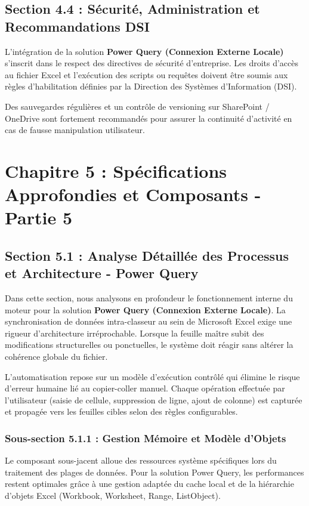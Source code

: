 \documentclass[12pt,a4paper]{report}
\begin{document}
\section{Section 4.4 : Sécurité, Administration et Recommandations DSI}
L'intégration de la solution \textbf{Power Query (Connexion Externe Locale)} s'inscrit dans le respect des directives de sécurité d'entreprise. Les droits d'accès au fichier Excel et l'exécution des scripts ou requêtes doivent être soumis aux règles d'habilitation définies par la Direction des Systèmes d'Information (DSI).

Des sauvegardes régulières et un contrôle de versioning sur SharePoint / OneDrive sont fortement recommandés pour assurer la continuité d'activité en cas de fausse manipulation utilisateur.


\chapter{Chapitre 5 : Spécifications Approfondies et Composants - Partie 5}

\section{Section 5.1 : Analyse Détaillée des Processus et Architecture - Power Query}
Dans cette section, nous analysons en profondeur le fonctionnement interne du moteur pour la solution \textbf{Power Query (Connexion Externe Locale)}. La synchronisation de données intra-classeur au sein de Microsoft Excel exige une rigueur d'architecture irréprochable. Lorsque la feuille maître subit des modifications structurelles ou ponctuelles, le système doit réagir sans altérer la cohérence globale du fichier.

L'automatisation repose sur un modèle d'exécution contrôlé qui élimine le risque d'erreur humaine lié au copier-coller manuel. Chaque opération effectuée par l'utilisateur (saisie de cellule, suppression de ligne, ajout de colonne) est capturée et propagée vers les feuilles cibles selon des règles configurables.


\subsection{Sous-section 5.1.1 : Gestion Mémoire et Modèle d'Objets}
Le composant sous-jacent alloue des ressources système spécifiques lors du traitement des plages de données. Pour la solution Power Query, les performances restent optimales grâce à une gestion adaptée du cache local et de la hiérarchie d'objets Excel (Workbook, Worksheet, Range, ListObject).
\end{document}
